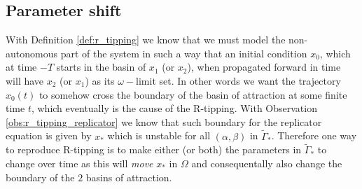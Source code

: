 \documentclass[../main.tex]{subfiles}
\begin{document}
\subsection{Parameter shift}\label{subsec:shift}

With Definition \ref{def:r_tipping} we know that we must model the non-autonomous part of the system in such a way that an initial condition $x_{0}$, which at time $-T$ starts in the basin of $x_{1}$ (or $x_{2}$), when propagated forward in time will have $x_{2}$ (or $x_{1}$) as its $\omega-$limit set.
In other words we want the trajectory $x_{0}(t)$ to somehow cross the boundary of the basin of attraction at some finite time $t$, which eventually is the cause of the R-tipping.
With Observation \ref{obs:r_tipping_replicator} we know that such boundary for the replicator equation is given by $x_{*}$ which is unstable for all $(\alpha,\beta)$ in $\tilde{\Gamma}_{*}$.
Therefore one way to reproduce R-tipping is to make either (or both) the parameters in $\tilde{\Gamma}_{*}$ to change over time as this will \textit{move} $x_{*}$ in $\Omega$ and consequentally also change the boundary of the $2$ basins of attraction.



\end{document}
